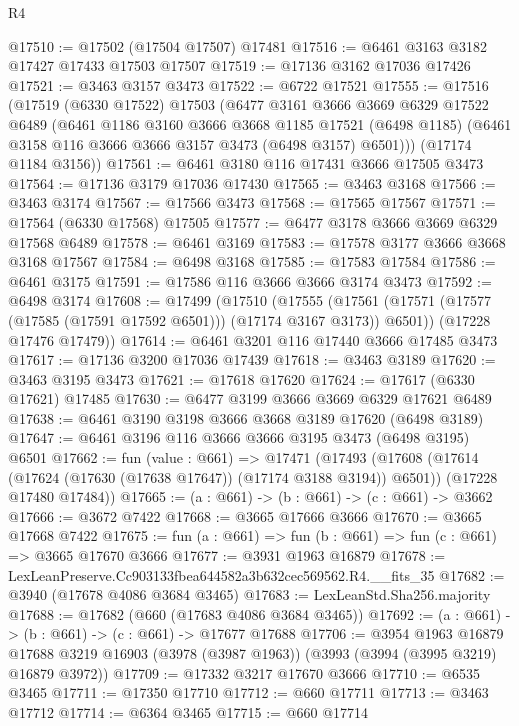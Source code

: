 \begin{lexlean}{R4}
\begin{coremodule}
@17510 := @17502 (@17504 @17507) @17481
@17516 := @6461 @3163 @3182 @17427 @17433 @17503 @17507
@17519 := @17136 @3162 @17036 @17426
@17521 := @3463 @3157 @3473
@17522 := @6722 @17521
@17555 := @17516
    (@17519
      (@6330 @17522)
      @17503
      (@6477
        @3161
        @3666
        @3669
        @6329
        @17522
        @6489
        (@6461
          @1186
          @3160
          @3666
          @3668
          @1185
          @17521
          (@6498 @1185)
          (@6461 @3158 @116 @3666 @3666 @3157 @3473 (@6498 @3157) @6501)))
      (@17174 @1184 @3156))
@17561 := @6461 @3180 @116 @17431 @3666 @17505 @3473
@17564 := @17136 @3179 @17036 @17430
@17565 := @3463 @3168
@17566 := @3463 @3174
@17567 := @17566 @3473
@17568 := @17565 @17567
@17571 := @17564 (@6330 @17568) @17505
@17577 := @6477 @3178 @3666 @3669 @6329 @17568 @6489
@17578 := @6461 @3169
@17583 := @17578 @3177 @3666 @3668 @3168 @17567
@17584 := @6498 @3168
@17585 := @17583 @17584
@17586 := @6461 @3175
@17591 := @17586 @116 @3666 @3666 @3174 @3473
@17592 := @6498 @3174
@17608 := @17499
    (@17510
      (@17555 (@17561 (@17571 (@17577 (@17585 (@17591 @17592 @6501))) (@17174 @3167 @3173)) @6501))
      (@17228 @17476 @17479))
@17614 := @6461 @3201 @116 @17440 @3666 @17485 @3473
@17617 := @17136 @3200 @17036 @17439
@17618 := @3463 @3189
@17620 := @3463 @3195 @3473
@17621 := @17618 @17620
@17624 := @17617 (@6330 @17621) @17485
@17630 := @6477 @3199 @3666 @3669 @6329 @17621 @6489
@17638 := @6461 @3190 @3198 @3666 @3668 @3189 @17620 (@6498 @3189)
@17647 := @6461 @3196 @116 @3666 @3666 @3195 @3473 (@6498 @3195) @6501
@17662 := fun (value : @661) =>
  @17471
    (@17493
      (@17608 (@17614 (@17624 (@17630 (@17638 @17647)) (@17174 @3188 @3194)) @6501))
      (@17228 @17480 @17484))
@17665 := (a : @661) -> (b : @661) -> (c : @661) -> @3662
@17666 := @3672 @7422
@17668 := @3665 @17666 @3666
@17670 := @3665 @17668 @7422
@17675 := fun (a : @661) => fun (b : @661) => fun (c : @661) => @3665 @17670 @3666
@17677 := @3931 @1963 @16879
@17678 := LexLeanPreserve.Cc903133fbea644582a3b632cec569562.R4.__fits_35
@17682 := @3940 (@17678 @4086 @3684 @3465)
@17683 := LexLeanStd.Sha256.majority
@17688 := @17682 (@660 (@17683 @4086 @3684 @3465))
@17692 := (a : @661) -> (b : @661) -> (c : @661) -> @17677 @17688
@17706 := @3954
    @1963
    @16879
    @17688
    @3219
    @16903
    (@3978 (@3987 @1963))
    (@3993 (@3994 (@3995 @3219) @16879 @3972))
@17709 := @17332 @3217 @17670 @3666
@17710 := @6535 @3465
@17711 := @17350 @17710
@17712 := @660 @17711
@17713 := @3463 @17712
@17714 := @6364 @3465
@17715 := @660 @17714

\end{coremodule}
\end{lexlean}
